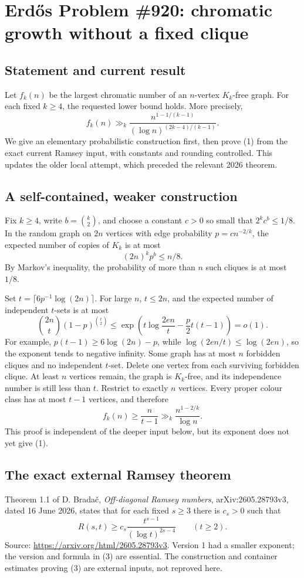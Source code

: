 \section*{Erd\H{o}s Problem \#920: chromatic growth without a fixed clique}
\subsection*{Statement and current result}
Let \(f_k(n)\) be the largest chromatic number of an \(n\)-vertex \(K_k\)-free graph. For each fixed \(k\geq4\), the requested lower bound holds. More precisely,
\[
f_k(n)\gg_k
\frac{n^{1-1/(k-1)}}{(\log n)^{(2k-4)/(k-1)}}. \tag{1}
\]
We give an elementary probabilistic construction first, then prove (1) from the exact current Ramsey input, with constants and rounding controlled. This updates the older local attempt, which preceded the relevant 2026 theorem.

\subsection*{A self-contained, weaker construction}
Fix \(k\geq4\), write \(b=\binom{k}{2}\), and choose a constant \(c>0\) so small that \(2^kc^b\leq1/8\). In the random graph on \(2n\) vertices with edge probability
\(p=cn^{-2/k}\), the expected number of copies of \(K_k\) is at most
\[
(2n)^kp^b\leq n/8.
\]
By Markov's inequality, the probability of more than \(n\) such cliques is at most \(1/8\).

Set \(t=\lceil6p^{-1}\log(2n)\rceil\). For large \(n\), \(t\leq2n\), and the expected number of independent \(t\)-sets is at most
\[
\binom{2n}{t}(1-p)^{\binom t2}
\leq \exp\left(t\log\frac{2en}{t}-\frac p2t(t-1)\right)=o(1).
\]
For example, \(p(t-1)\geq6\log(2n)-p\), while
\(\log(2en/t)\leq\log(2en)\), so the exponent tends to negative infinity.
Some graph has at most \(n\) forbidden cliques and no independent \(t\)-set. Delete one vertex from each surviving forbidden clique. At least \(n\) vertices remain, the graph is \(K_k\)-free, and its independence number is still less than \(t\). Restrict to exactly \(n\) vertices. Every proper colour class has at most \(t-1\) vertices, and therefore
\[
f_k(n)\geq\frac{n}{t-1}\gg_k\frac{n^{1-2/k}}{\log n}. \tag{2}
\]
This proof is independent of the deeper input below, but its exponent does not yet give (1).

\subsection*{The exact external Ramsey theorem}
Theorem 1.1 of D. Brada\v{c}, \emph{Off-diagonal Ramsey numbers}, arXiv:2605.28793v3, dated 16 June 2026, states that for each fixed \(s\geq3\) there is \(c_s>0\) such that
\[
R(s,t)\geq c_s\frac{t^{s-1}}{(\log t)^{2s-4}}\qquad(t\geq2). \tag{3}
\]
Source: \url{https://arxiv.org/html/2605.28793v3}.
Version 1 had a smaller exponent; the version and formula in (3) are essential. The construction and container estimates proving (3) are external inputs, not reproved here.

